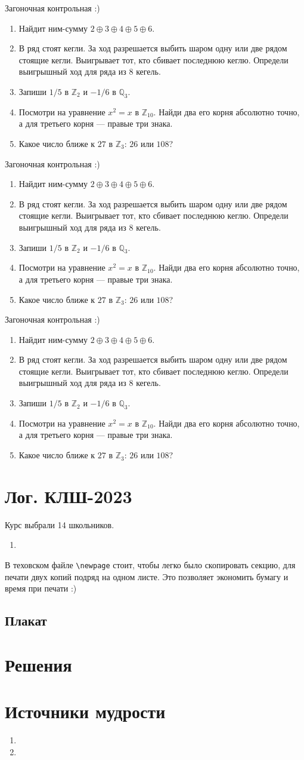 \documentclass[12pt]{article}
\newcommand{\Z}{\mathbb{Z}}
\newcommand{\Q}{\mathbb{Q}}
\newcounter{problem}[section]
\theoremstyle{definition}
\begin{document}
\newpage
\dayfive
\vfill
\dayfive
\newpage

\newcommand{\zagon}{Загоночная контрольная :)

\begin{enumerate}
  \item Найдит ним-сумму $2\oplus 3 \oplus 4 \oplus 5 \oplus 6$.
  \item В ряд стоят кегли. За ход разрешается выбить шаром одну или две рядом стоящие кегли. 
  Выигрывает тот, кто сбивает последнюю кеглю.
  Определи выигрышный ход для ряда из 8 кегель. 
  \item Запиши $1/5$ в $\Z_2$ и $-1/6$ в $\Q_3$.
  \item Посмотри на уравнение $x^2=x$ в $\Z_{10}$. 
  Найди два его корня абсолютно точно, а для третьего корня — правые три знака.
  \item Какое число ближе к $27$ в $\Z_3$: $26$ или $108$?
\end{enumerate}
}



\newpage
\zagon
\vfill
\zagon
\vfill
\zagon
\newpage



\section{Лог. КЛШ-2023}

Курс выбрали 14 школьников.

\begin{enumerate}
  \item 
\end{enumerate}

В теховском файле \verb|\newpage| стоит, чтобы легко было скопировать секцию, для печати двух копий подряд на одном листе.
Это позволяет экономить бумагу и время при печати :)

\subsection{Плакат}






\renewenvironment{solution}[1]{%
         \vskip .5cm plus 2cm minus 0.1cm%
         {\bfseries \hyperlink{problem:#1}{#1.}}%
}%
{%
}%



\section{Решения}



\section{Источники мудрости}


\begin{enumerate}
\item 
\item 
\end{enumerate}

\printbibliography[heading=none]
\end{document}
